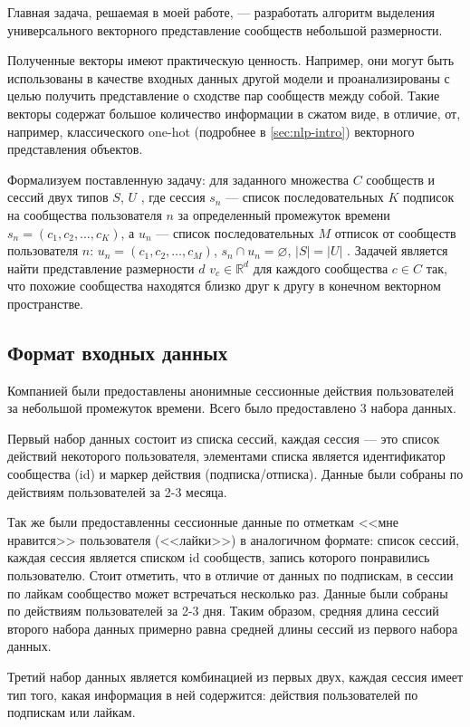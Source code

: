 \documentclass[times,specification,annotation]{itmo-student-thesis}
\begin{document}
Главная задача, решаемая в моей работе, --- разработать алгоритм выделения универсального векторного представление сообществ небольшой размерности. 

Полученные векторы имеют практическую ценность. Например, они могут быть использованы в
качестве входных данных другой модели и проанализированы с целью
получить представление о сходстве пар сообществ между собой. Такие векторы содержат большое количество информации в сжатом виде, в отличие, от, например, классического one-hot (подробнее в \ref{sec:nlp-intro}) векторного представления объектов.

Формализуем поставленную задачу: для заданного множества $C$ сообществ и сессий двух типов $S$, $U$ , где сессия $s_n$ --- список последовательных $K$ подписок на сообщества пользователя $n$ за определенный промежуток времени $s_n = (c_{1}, c_{2}, \dots, c_{K})$, а $u_n$ --- список последовательных $M$ отписок от сообществ пользователя $n$: $u_n = (c_{1},  c_{2}, \dots, c_{M})$, $s_n \cap u_n = \varnothing$, $|S| = |U|$ .  
Задачей является найти представление размерности $d$ $v_{c} \in \mathbb{R}^d$ для каждого сообщества $c \in C$ так, что похожие сообщества находятся близко друг к другу в конечном векторном пространстве. 

\subsection{Формат входных данных}

Компанией были предоставлены анонимные сессионные действия пользователей за небольшой промежуток времени. Всего было предоставлено 3 набора данных.

Первый набор данных состоит из списка сессий, каждая сессия --- это список действий некоторого пользователя, элементами списка является идентификатор сообщества (id) и маркер действия (подписка/отписка). Данные были собраны по действиям пользователей за 2-3 месяца.

Так же были предоставленны сессионные данные по отметкам <<мне нравится>> пользователя (<<лайки>>) в аналогичном формате: список сессий, каждая сессия является списком id сообществ, запись которого понравились пользователю. Стоит отметить, что в отличие от данных по подпискам, в сессии по лайкам сообщество может встречаться несколько раз. Данные были собраны по действиям пользователей за 2-3 дня. Таким образом, средняя длина сессий второго набора данных примерно равна средней длины сессий из первого набора данных. 

Третий набор данных является комбинацией из первых двух, каждая сессия имеет тип того, какая информация в ней содержится: действия пользователей по подпискам или лайкам. 
\end{document}
